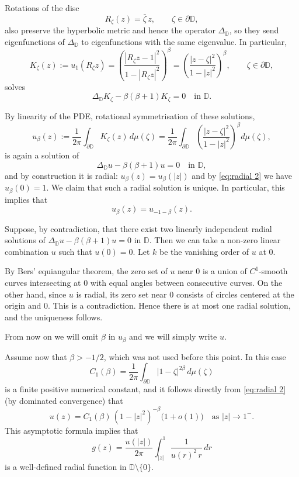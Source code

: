 \documentclass{article}
\begin{document}
Rotations of the disc
\[
R_\zeta(z) = \bar\zeta\, z, \qquad \zeta\in\partial\mathbb{D},
\]
also preserve the hyperbolic metric and hence the operator $\Delta_{\mathbb{D}}$, so they send eigenfunctions of $\Delta_{\mathbb{D}}$ to eigenfunctions with the same eigenvalue. In particular,
\[
K_\zeta(z)
:= u_1(R_\zeta z)
= \left(\frac{|R_\zeta z-1|^2}{1-|R_\zeta z|^2}\right)^{\beta}
= \left(\frac{|z-\zeta|^2}{1-|z|^2}\right)^{\beta}, \qquad \zeta\in\partial\mathbb{D},
\]
solves
\[
\Delta_{\mathbb{D}} K_\zeta - \beta(\beta+1)K_\zeta = 0 \quad\text{in }\mathbb{D}.
\]

By linearity of the PDE, rotational symmetrisation of these solutions,
\begin{equation} \label{eq:radial 2}
u_\beta(z)
:= \frac{1}{2\pi}\int_{\partial\mathbb{D}} K_\zeta(z)\,d\mu(\zeta)
= \frac{1}{2\pi}\int_{\partial\mathbb{D}}
\left(\frac{|z-\zeta|^2}{1-|z|^2}\right)^{\beta} d\mu(\zeta),
\end{equation}
is again a solution of
\[
\Delta_{\mathbb{D}} u - \beta(\beta+1)u = 0 \quad\text{in }\mathbb{D},
\]
and by construction it is radial: $u_\beta(z)=u_\beta(|z|)$ and by \eqref{eq:radial 2} we have $u_\beta(0)=1$. We claim that such a radial solution is unique. In particular, this implies that
\[
u_\beta(z) = u_{-1-\beta}(z).
\]

Suppose, by contradiction, that there exist two linearly independent radial
solutions of $\Delta_{\mathbb{D}} u - \beta(\beta+1)u = 0$ in $\mathbb{D}$.
Then we can take a non-zero linear combination $u$ such that $u(0)=0$. Let $k$
be the vanishing order of $u$ at $0$.

By Bers' equiangular theorem, the zero set of $u$ near $0$ is a union of 
$C^1$-smooth curves intersecting at $0$ with equal angles between consecutive curves.
On the other hand, since $u$ is radial, its zero set near $0$ consists of circles centered at the origin and $0$. This is a
contradiction. Hence there is at most one radial solution, and the uniqueness
follows.

From now on we will omit $\beta$ in $u_\beta$ and we will simply write $u$. 

Assume now that $\beta>-1/2$, which was not used before this point. In this
case
\[
C_1(\beta)=\frac{1}{2\pi}\int_{\partial\mathbb{D}}
|1-\zeta|^{2\beta} \, d\mu(\zeta)
\]
is a finite positive numerical constant, and it follows directly from
\eqref{eq:radial 2} (by dominated convergence) that
\[
u(z)
= C_1(\beta)\,(1 - |z|^2)^{-\beta}\bigl(1+o(1)\bigr)
\quad\text{as }|z|\to 1^-.
\]
This asymptotic formula implies that
\begin{equation} \label{eq: radial fundamental 2}
g(z)= \frac{u(|z|)}{2\pi}\int_{|z|}^{1}\frac{1}{u(r)^2\,r}\,dr
\end{equation}
is a well-defined radial function in $\mathbb{D}\setminus\{0\}$. 
\end{document}
